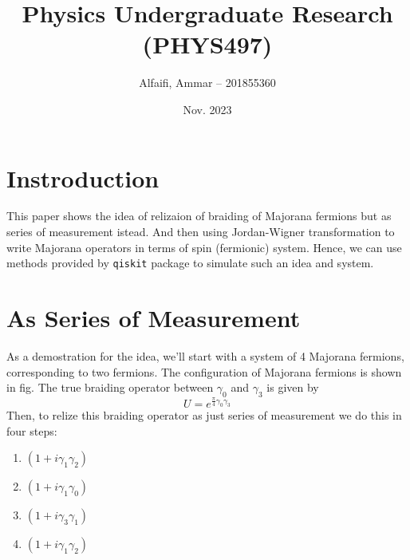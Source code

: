 \documentclass{article}
\title{Physics Undergraduate Research (PHYS497)}
\author{Alfaifi, Ammar -- 201855360}
\date{Nov. 2023}
\def\c#1{\texttt{#1}}
\begin{document}
\maketitle

\section{Instroduction} %
\label{sec:Instroduction}
This paper shows the idea of relizaion of braiding of Majorana fermions but as
series of measurement istead. And then using Jordan-Wigner transformation to
write Majorana operators in terms of spin (fermionic) system. Hence, we can use
methods provided by \c{qiskit} package to simulate such an idea and system.

\section{As Series of Measurement} %
\label{sec:As Series of measurement}
As a demostration for the idea, we'll start with a system of 4 Majorana fermions,
corresponding to two fermions. The configuration of Majorana fermions is shown in fig.
The true braiding operator between $\gamma_0$ and $ \gamma_3 $ is given by
\begin{equation}
	U = e^{\frac{\pi}{4} \gamma_0 \gamma_3}
	\label{eq:braiding op}
\end{equation}
Then, to relize this braiding operator as just series of measurement we do this in four steps:
\begin{enumerate}
	\item $ (1 + i \gamma_1 \gamma_2) $
	\item $ (1 + i \gamma_1 \gamma_0) $
	\item $ (1 + i \gamma_3 \gamma_1) $
	\item $ (1 + i \gamma_1 \gamma_2) $
\end{enumerate}
\end{document}
